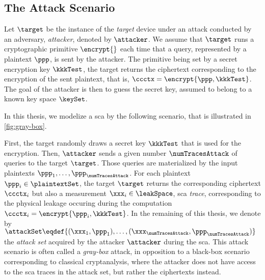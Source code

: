 \subsection{The Attack Scenario}
\label{sec:problem_position}
Let \(\target\) be the instance of the \emph{target} device under an attack conducted by an adversary, \aka{} \emph{attacker}, denoted by \(\attacker\).
We assume that \(\target\) runs a cryptographic primitive \(\encrypt{}\) each time that a query, represented by a plaintext \(\ppp\), is sent by the attacker.
The primitive being set by a secret encryption key \(\kkkTest\), the target returns the ciphertext corresponding to the encryption of the sent plaintext, that is, \(\ccctx = \encrypt{\ppp, \kkkTest}\).
The goal of the attacker is then to guess the secret key, assumed to belong to a known key space \(\keySet\).

In this thesis, we modelize a \gls{sca} by the following scenario, that is illustrated in \autoref{fig:gray-box}.

First, the target randomly draws a secret key \(\kkkTest\) that is used for the encryption.
Then, \(\attacker\) sends a given number \(\numTracesAttack\) of queries to the target \(\target\).
Those queries are materialized by the input plaintexts \(\ppp_1, \ldots, \ppp_{\numTracesAttack}\).
For each plaintext \(\ppp_i \in \plaintextSet\), the target \(\target\) returns the corresponding ciphertext \(\ccctx_i\) but also a measurement \(\xxx_i \in \leakSpace\), \aka{} \gls{sca} \emph{trace}, corresponding to the physical leakage occuring during the computation \(\ccctx_i = \encrypt{\ppp_i, \kkkTest}\).
In the remaining of this thesis, we denote by \(\attackSet \eqdef \-\{(\xxx_1, \ppp_1), \ldots, (\xxx_{\numTracesAttack}, \ppp_{\numTracesAttack})\}\) the \emph{attack set} acquired by the attacker \(\attacker\) during the \gls{sca}.
This attack scenario is often called a \emph{gray-box} attack, in opposition to a black-box scenario corresponding to classical cryptanalysis, where the attacker does not have access to the \gls{sca} traces in the attack set, but rather the ciphertexts instead.

